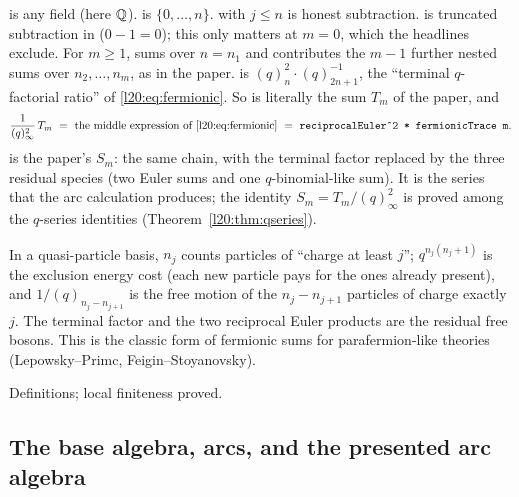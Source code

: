 \begin{dictionary}
 is any field (here ${\mathbb{Q}}$).  is $\{0,\dots,n\}$.  with
$j\le n$ is honest subtraction.  is truncated subtraction in  ($0-1=0$); this only matters
at $m=0$, which the headlines exclude. For $m\ge1$,  sums over $n=n_1$ and
 contributes the $m-1$ further nested sums over $n_2,\dots,n_m$, as in the paper.  is $(q)_n^2\cdot(q)_{2n+1}^{-1}$, the ``terminal
$q$-factorial ratio'' of \eqref{l20:eq:fermionic}. So  is literally the sum
$T_m$ of the paper, and
\begin{equation*}
\frac{1}{(q)_\infty^2}\,T_m\ =\ \text{the middle expression of \eqref{l20:eq:fermionic}}
\ =\ \texttt{reciprocalEuler\^{}2 * fermionicTrace m}.
\end{equation*}
 is the paper's $S_m$: the same chain, with the terminal factor replaced by the
three residual species (two Euler sums and one $q$-binomial-like sum). It is the series that the arc
calculation produces; the identity $S_m=T_m/(q)_\infty^2$ is proved among the $q$-series identities (Theorem~\ref{l20:thm:qseries}).
\end{dictionary}

\begin{physics}
In a quasi-particle basis, $n_j$ counts particles of ``charge at least $j$''; $q^{n_j(n_j+1)}$ is the
exclusion energy cost (each new particle pays for the ones already present), and $1/(q)_{n_j-n_{j+1}}$ is the
free motion of the $n_j-n_{j+1}$ particles of charge exactly $j$. The terminal factor and the two reciprocal
Euler products are the residual free bosons. This is the classic form of fermionic sums for
parafermion-like theories (Lepowsky--Primc, Feigin--Stoyanovsky).
\end{physics}

\begin{status}
Definitions; local finiteness proved.
\end{status}

\subsection{The base algebra, arcs, and the presented arc algebra}

